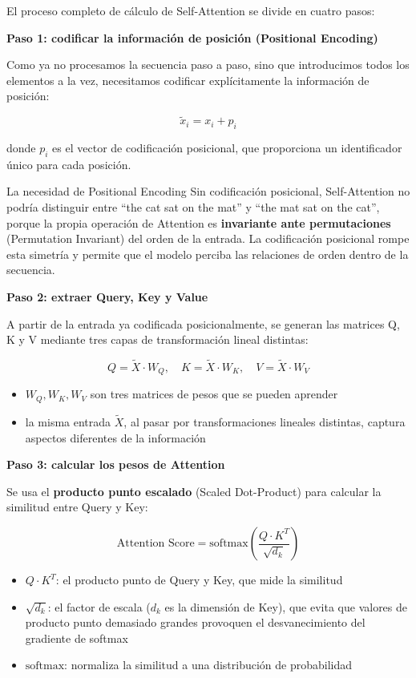 \documentclass[a4paper]{article}
\begin{document}
El proceso completo de cálculo de Self-Attention se divide en cuatro pasos:

\textbf{Paso 1: codificar la información de posición (Positional Encoding)}

Como ya no procesamos la secuencia paso a paso, sino que introducimos todos los elementos a la vez, necesitamos codificar explícitamente la información de posición:

$$\tilde{x}_i = x_i + p_i$$

donde $p_i$ es el vector de codificación posicional, que proporciona un identificador único para cada posición.

\begin{importantbox}{La necesidad de Positional Encoding}
Sin codificación posicional, Self-Attention no podría distinguir entre ``the cat sat on the mat'' y ``the mat sat on the cat'', porque la propia operación de Attention es \textbf{invariante ante permutaciones} (Permutation Invariant) del orden de la entrada. La codificación posicional rompe esta simetría y permite que el modelo perciba las relaciones de orden dentro de la secuencia.
\end{importantbox}

\textbf{Paso 2: extraer Query, Key y Value}

A partir de la entrada ya codificada posicionalmente, se generan las matrices Q, K y V mediante tres capas de transformación lineal distintas:

$$Q = \tilde{X} \cdot W_Q, \quad K = \tilde{X} \cdot W_K, \quad V = \tilde{X} \cdot W_V$$

\begin{itemize}
    \item $W_Q, W_K, W_V$ son tres matrices de pesos que se pueden aprender
    \item la misma entrada $\tilde{X}$, al pasar por transformaciones lineales distintas, captura aspectos diferentes de la información
\end{itemize}

\textbf{Paso 3: calcular los pesos de Attention}

Se usa el \textbf{producto punto escalado} (Scaled Dot-Product) para calcular la similitud entre Query y Key:

$$\text{Attention Score} = \text{softmax}\left(\frac{Q \cdot K^T}{\sqrt{d_k}}\right)$$

\begin{itemize}
    \item $Q \cdot K^T$: el producto punto de Query y Key, que mide la similitud
    \item $\sqrt{d_k}$: el factor de escala ($d_k$ es la dimensión de Key), que evita que valores de producto punto demasiado grandes provoquen el desvanecimiento del gradiente de softmax
    \item $\text{softmax}$: normaliza la similitud a una distribución de probabilidad
\end{itemize}
\end{document}
